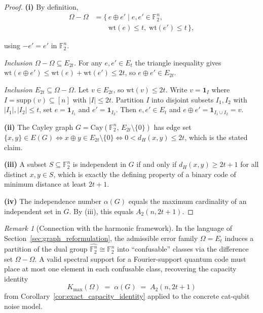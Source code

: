 \documentclass[a4paper,twocolumn,11pt,allowtoday]{quantumarticle}
\theoremstyle{plain}
\theoremstyle{definition}
\theoremstyle{remark}
\newtheorem{remark}[theorem]{Remark}
\begin{document}
\begin{proof}
\textbf{(i)}
By definition,
\[
\begin{aligned}
\Omega-\Omega
   &= \{\,e\oplus e' \mid e,e'\in\mathbb{F}_2^n, \\
   &\qquad \mathrm{wt}(e)\le t,\;
            \mathrm{wt}(e')\le t \,\},
\end{aligned}
\]

using $-e'=e'$ in $\mathbb{F}_2^n$.

\emph{Inclusion $\Omega-\Omega\subseteq E_{2t}$.}
For any $e,e'\in E_t$ the triangle inequality gives
$\mathrm{wt}(e\oplus e') \le \mathrm{wt}(e)+\mathrm{wt}(e') \le 2t$,
so $e\oplus e'\in E_{2t}$.

\emph{Inclusion $E_{2t}\subseteq\Omega-\Omega$.}
Let $v\in E_{2t}$, so $\mathrm{wt}(v)\le 2t$. Write
$v=\mathbf{1}_I$ where $I=\mathrm{supp}(v)\subseteq[n]$ with
$|I|\le 2t$. Partition $I$ into disjoint subsets $I_1,I_2$ with
$|I_1|,|I_2|\le t$, set $e=\mathbf{1}_{I_1}$ and
$e'=\mathbf{1}_{I_2}$. Then $e,e'\in E_t$ and
$e\oplus e' = \mathbf{1}_{I_1\cup I_2} = v$.

\textbf{(ii)}
The Cayley graph $G=\mathrm{Cay}(\mathbb{F}_2^n,\,E_{2t}\setminus\{0\})$
has edge set
$\{x,y\}\in E(G)\Leftrightarrow x\oplus y\in E_{2t}\setminus\{0\}
\Leftrightarrow 0<d_H(x,y)\le 2t$,
which is the stated claim.

\textbf{(iii)}
A subset $S\subseteq\mathbb{F}_2^n$ is independent in $G$ if and
only if $d_H(x,y)\ge 2t+1$ for all distinct $x,y\in S$, which is
exactly the defining property of a binary code of minimum distance
at least $2t+1$.

\textbf{(iv)}
The independence number $\alpha(G)$ equals the maximum cardinality
of an independent set in $G$. By (iii), this equals $A_2(n,2t+1)$.
\end{proof}

\begin{remark}[Connection with the harmonic framework]
\label{rem:catq_harmonic}
In the language of Section~\ref{sec:graph_reformulation}, the
admissible error family $\Omega=E_t$ induces a partition of the dual
group $\widehat{\mathbb{F}_2^n}\cong\mathbb{F}_2^n$ into
``confusable'' classes via the difference set $\Omega-\Omega$. A
valid spectral support for a Fourier-support quantum code must place
at most one element in each confusable class, recovering the capacity
identity
\[
   K_{\max}(\Omega) \;=\; \alpha(G) \;=\; A_2(n,2t+1)
\]
from Corollary~\ref{cor:exact_capacity_identity} applied to the
concrete cat-qubit noise model.
\end{remark}
\end{document}

